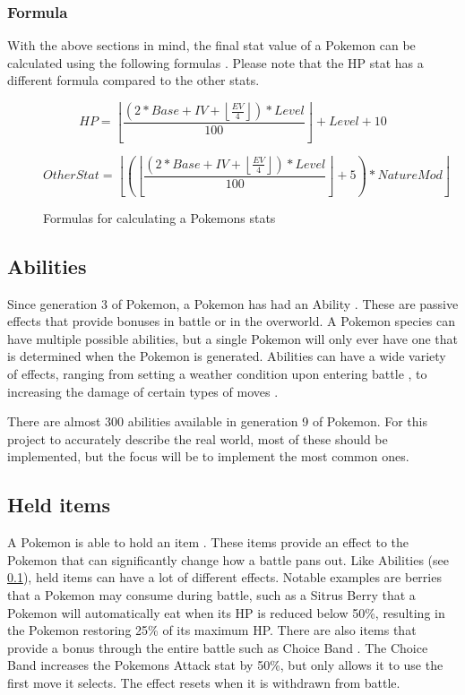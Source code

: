 \subsubsection{Formula}
With the above sections in mind, the final stat value of a Pokemon can be calculated using the following formulas \cite{PokemonStats}.
Please note that the HP stat has a different formula compared to the other stats.

\begin{figure}
  $$
    HP = \left\lfloor \frac{(2 * Base + IV + \left\lfloor \frac{EV}{4} \right\rfloor) * Level}{100} \right\rfloor + Level + 10
  $$
  
  $$
    OtherStat = \left\lfloor \left( \left\lfloor \frac{(2 * Base + IV + \left\lfloor \frac{EV}{4} \right\rfloor) * Level}{100} \right\rfloor + 5 \right) * NatureMod \right\rfloor
  $$
  \caption{Formulas for calculating a Pokemons stats \cite{PokemonStats}}
  \label{formula:stat-formula}
\end{figure}

\subsection{Abilities}
\label{subsec:abilities}
Since generation 3 of Pokemon, a Pokemon has had an Ability \cite{Abilities}. These are passive effects that provide bonuses in battle or in the overworld.
A Pokemon species can have multiple possible abilities, but a single Pokemon will only ever have one that is determined when the Pokemon is generated.
Abilities can have a wide variety of effects, ranging from setting a weather condition upon entering battle \cite{DrizzleAbility}, to increasing the damage of certain types of moves \cite{IronFistAbility}.

There are almost 300 abilities available in generation 9 of Pokemon. For this project to accurately describe the real world, most of these should be implemented, but the focus will be to implement the most common ones.

\subsection{Held items}
A Pokemon is able to hold an item \cite{HeldItems}. These items provide an effect to the Pokemon that can significantly change how a battle pans out. Like Abilities (see \ref{subsec:abilities}),
held items can have a lot of different effects. Notable examples are berries that a Pokemon may consume during battle, such as a Sitrus Berry \cite{SitrusBerry} that a Pokemon will automatically eat
when its HP is reduced below 50\%, resulting in the Pokemon restoring 25\% of its maximum HP. There are also items that provide a bonus through the entire battle such as Choice Band \cite{ChoiceBand}.
The Choice Band increases the Pokemons Attack stat by 50\%, but only allows it to use the first move it selects. The effect resets when it is withdrawn from battle.

